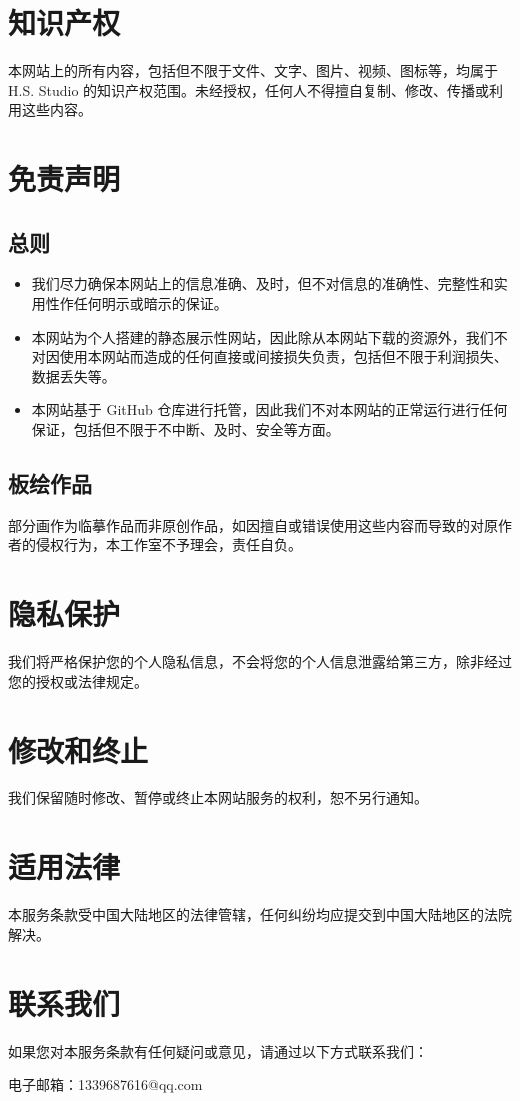 \documentclass{article}
\begin{document}
\section{知识产权}

本网站上的所有内容，包括但不限于文件、文字、图片、视频、图标等，均属于 H.S. Studio 的知识产权范围。未经授权，任何人不得擅自复制、修改、传播或利用这些内容。

\section{免责声明}

\subsection*{总则}

\begin{itemize}
    \item 我们尽力确保本网站上的信息准确、及时，但不对信息的准确性、完整性和实用性作任何明示或暗示的保证。
    \item 本网站为个人搭建的静态展示性网站，因此除从本网站下载的资源外，我们不对因使用本网站而造成的任何直接或间接损失负责，包括但不限于利润损失、数据丢失等。
    \item 本网站基于 GitHub 仓库进行托管，因此我们不对本网站的正常运行进行任何保证，包括但不限于不中断、及时、安全等方面。
\end{itemize}

\subsection*{板绘作品}

部分画作为临摹作品而非原创作品，如因擅自或错误使用这些内容而导致的对原作者的侵权行为，本工作室不予理会，责任自负。

\section{隐私保护}

我们将严格保护您的个人隐私信息，不会将您的个人信息泄露给第三方，除非经过您的授权或法律规定。

\section{修改和终止}

我们保留随时修改、暂停或终止本网站服务的权利，恕不另行通知。

\section{适用法律}

本服务条款受中国大陆地区的法律管辖，任何纠纷均应提交到中国大陆地区的法院解决。

\section*{联系我们}

如果您对本服务条款有任何疑问或意见，请通过以下方式联系我们：

电子邮箱：1339687616@qq.com
\end{document}
